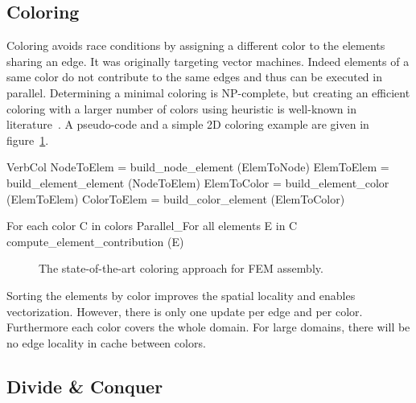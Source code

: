 \documentclass[10pt]{IOS-Book-Article}
\begin{document}
\subsection{Coloring}
\label{sec:col}
Coloring avoids race conditions by assigning a different color to the elements sharing an edge.
It was originally targeting vector machines. Indeed elements of a same color do not contribute to the same edges and thus can be executed in parallel.
Determining a minimal coloring is NP-complete, but creating an efficient coloring with a larger number of colors using heuristic is well-known in literature~\cite{CPUfe}.
A pseudo-code and a simple 2D coloring example are given in figure~\ref{fig:colApp}.

\begin{SaveVerbatim}[]{VerbCol}
NodeToElem = build_node_element (ElemToNode)
ElemToElem = build_element_element (NodeToElem)
ElemToColor = build_element_color (ElemToElem)
ColorToElem = build_color_element (ElemToColor)

For each color C in colors
  Parallel_For all elements E in C
    compute_element_contribution (E)
\end{SaveVerbatim}

\begin{figure}[htp]
\caption{The state-of-the-art coloring approach for FEM assembly. }
\label{fig:colApp}
\end{figure}

Sorting the elements by color improves the spatial locality and enables vectorization.
However, there is only one update per edge and per color. Furthermore each color covers the whole domain.
For large domains, there will be no edge locality in cache between colors.

\subsection{Divide \& Conquer}
\end{document}
